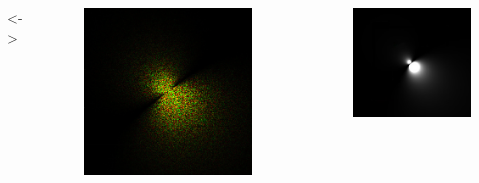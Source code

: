 \begin{frame}
\begin{columns}[c]
\uncover<\thefrequencydomainpauses->{
\begin{figure}
\centering
\includegraphics[width=\textwidth]{Images/Other/Fourier_transform}
\end{figure}%
\begin{figure}
\centering
\includegraphics[width=\textwidth]{Images/Other/spectrum_res_increment}
\end{figure}

}

\end{columns}

\end{frame}

